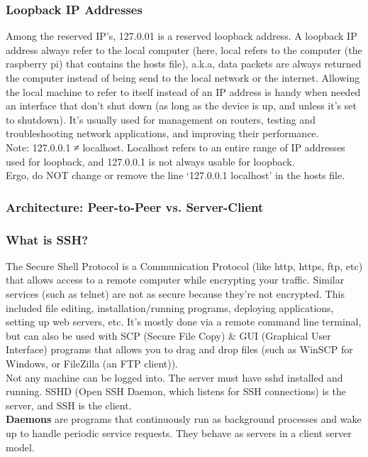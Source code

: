 \documentclass[a4paper, 10pt]{article}
\begin{document}
            \subsubsection{Loopback IP Addresses}
                Among the reserved IP’s, 127.0.01 is a reserved loopback address. 
                A loopback IP address always refer to the local computer (here, local refers to the computer (the raspberry pi) that contains the hosts file), a.k.a, data packets are always returned the computer instead of being send to the local network or the internet. Allowing the local machine to refer to itself instead of an IP address is handy when needed an interface that don’t shut down (as long as the device is up, and unless it’s set to shutdown). It’s usually used for management on routers, testing and troubleshooting network applications, and improving their performance.  \\

                Note: 127.0.0.1 ≠ localhost. Localhost refers to an entire range of IP addresses used for loopback, and 127.0.0.1 is not always usable for loopback. \\

                \noindent Ergo, do NOT change or remove the line ‘127.0.0.1 localhost’ in the hosts file.

            \subsubsection{Architecture: Peer-to-Peer vs. Server-Client}
            \subsubsection{What is SSH?}
                The Secure Shell Protocol is a Communication Protocol (like http, https, ftp, etc) that allows access to a remote computer while encrypting your traffic. Similar services (such as telnet) are not as secure because they’re not encrypted. This included file editing, installation/running programs, deploying applications, setting up web servers, etc. It’s mostly done via a remote command line terminal, but can also be used with SCP (Secure File Copy) & GUI (Graphical User Interface) programs that allows you to drag and drop files (such as WinSCP for Windows, or FileZilla (an FTP client)). \\
    
                Not any machine can be logged into. The server must have sshd installed and running. SSHD (Open SSH Daemon, which listens for SSH connections) is the server, and SSH is the client.\\
                \textbf{Daemons} are programs that continuously run as background processes and wake up to handle periodic service requests. They behave as servers in a client server model.\\
\end{document}

